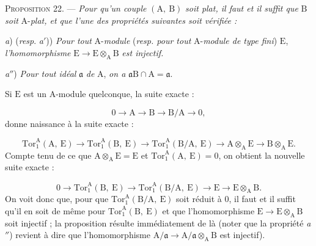 \textsc{Proposition} 22. --- \textit{Pour qu'un couple} $(\mathrm{A},\ \mathrm{B})$ \textit{soit plat, il faut et il suffit que} $\mathrm{B}$ \textit{soit} $\mathrm{A}$-\textit{plat, et que l'une des propriétés suivantes soit vérifiée :}

\textit{a}) (\textit{resp}. \textit{a}$'$)) \textit{Pour tout} $\mathrm{A}$-\textit{module} (\textit{resp. pour tout} $\mathrm{A}$-\textit{module de type fini}) $\mathrm{E}$, \textit{l'homomorphisme} $\mathrm{E} \to \mathrm{E} \otimes_\mathrm{A} \mathrm{B}$ \textit{est injectif.}

\textit{a}$''$) \textit{Pour tout idéal} $\mathfrak{a}$ \textit{de} $\mathrm{A}$, \textit{on a} $\mathfrak{a}\mathrm{B} \cap \mathrm{A} = \mathfrak{a}$.

Si $\mathrm{E}$ est un $\mathrm{A}$-module quelconque, la suite exacte :

\begin{equation*}
0 \to \mathrm{A} \to \mathrm{B} \to \mathrm{B}/\mathrm{A} \to 0,
\end{equation*}
donne naissance à la suite exacte :

\begin{equation*}
\mathrm{Tor}_1^{\mathrm{A}}(\mathrm{A},\ \mathrm{E}) \to \mathrm{Tor}_1^{\mathrm{A}}(\mathrm{B},\ \mathrm{E}) \to \mathrm{Tor}_1^{\mathrm{A}}(\mathrm{B}/\mathrm{A},\ \mathrm{E}) \to \mathrm{A} \otimes_\mathrm{A} \mathrm{E} \to \mathrm{B} \otimes_\mathrm{A} \mathrm{E}.
\end{equation*}
Compte tenu de ce que $\mathrm{A} \otimes_\mathrm{A} \mathrm{E} = \mathrm{E}$ et $\mathrm{Tor}_1^{\mathrm{A}}(\mathrm{A},\ \mathrm{E}) = 0$, on obtient la nouvelle suite exacte :

\begin{equation*}
0 \to \mathrm{Tor}_1^{\mathrm{A}}(\mathrm{B},\ \mathrm{E}) \to \mathrm{Tor}_1^{\mathrm{A}}(\mathrm{B}/\mathrm{A},\ \mathrm{E}) \to \mathrm{E} \to \mathrm{E} \otimes_\mathrm{A} \mathrm{B}.
\end{equation*}
On voit donc que, pour que $\mathrm{Tor}_1^{\mathrm{A}}(\mathrm{B}/\mathrm{A},\ \mathrm{E})$ soit réduit à $0$, il faut et il suffit qu'il en soit de même pour $\mathrm{Tor}_1^{\mathrm{A}}(\mathrm{B},\ \mathrm{E})$ et que l'homomorphisme $\mathrm{E} \to \mathrm{E} \otimes_\mathrm{A} \mathrm{B}$ soit injectif ; la proposition résulte immédiatement de là (noter que la propriété \textit{a}$''$) revient à dire que l'homomorphisme $\mathrm{A}/\mathfrak{a} \to \mathrm{A}/\mathfrak{a} \otimes_\mathrm{A} \mathrm{B}$ est injectif).


